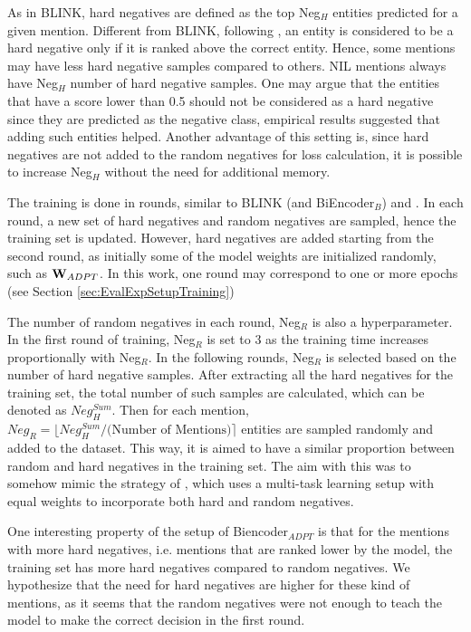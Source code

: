 \documentclass{report}
\theoremstyle{definition}
\theoremstyle{remark}
\begin{document}
As in BLINK, hard negatives are defined as the top Neg$_{H}$ entities predicted for a given mention. Different from BLINK, following \cite{googleintern}, an entity is considered to be a hard negative only if it is ranked above the correct entity. Hence, some mentions may have less hard negative samples compared to others. NIL mentions always have Neg$_{H}$ number of hard negative samples. One may argue that the entities that have a score lower than 0.5 should not be considered as a hard negative since they are predicted as the negative class, empirical results suggested that adding such entities helped. Another advantage of this setting is, since hard negatives are not added to the random negatives for loss calculation, it is possible to increase Neg$_{H}$ without the need for additional memory.

The training is done in rounds, similar to BLINK (and BiEncoder$_{B}$) and \cite{googleintern}. In each round, a new set of hard negatives and random negatives are sampled, hence the training set is updated. However, hard negatives are added starting from the second round, as initially some of the model weights are initialized randomly, such as $\bold{W}_{ADPT}$. In this work, one round may correspond to one or more epochs (see Section \ref{sec:EvalExpSetupTraining})

The number of random negatives in each round, Neg$_R$ is also a hyperparameter. In the first round of training, Neg$_R$ is set to 3 as the training time increases proportionally with Neg$_R$. In the following rounds, Neg$_R$ is selected based on the number of hard negative samples. After extracting all the hard negatives for the training set, the total number of such samples are calculated, which can be denoted as $Neg_{H}^{Sum}$. Then for each mention, $Neg_R = \lfloor Neg_{H}^{Sum}/ \text{(Number of Mentions)} \rceil$ entities are sampled randomly and added to the dataset. This way, it is aimed to have a similar proportion between random and hard negatives in the training set. The aim with this was to somehow mimic the strategy of \cite{googleintern}, which uses a multi-task learning setup with equal weights to incorporate both hard and random negatives. 

One interesting property of the setup of Biencoder$_{ADPT}$ is that for the mentions with more hard negatives, i.e. mentions that are ranked lower by the model, the training set has more hard negatives compared to random negatives. We hypothesize that the need for hard negatives are higher for these kind of mentions, as it seems that the random negatives were not enough to teach the model to make the correct decision in the first round.
\end{document}
